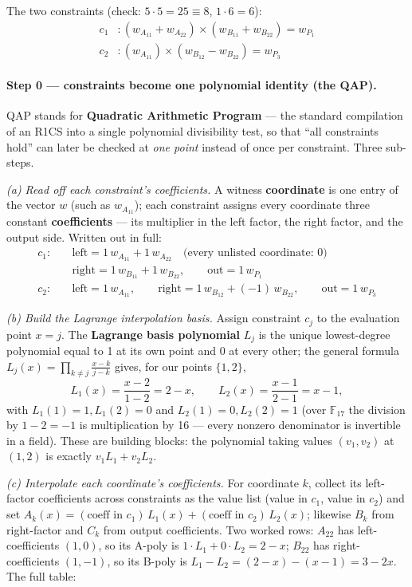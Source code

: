 \documentclass[10pt]{article}
\begin{document}
The two constraints (check: $5\cdot5 = 25 \equiv 8$,
$1\cdot6 = 6$):
\begin{align*}
c_1&: (w_{A_{11}} + w_{A_{22}}) \times (w_{B_{11}} + w_{B_{22}})
      = w_{P_1}\\
c_2&: (w_{A_{11}}) \times (w_{B_{12}} - w_{B_{22}}) = w_{P_3}
\end{align*}

\paragraph{Step 0 --- constraints become one polynomial identity
(the QAP).} QAP stands for \textbf{Quadratic Arithmetic Program}
\cite{ggpr} --- the standard compilation of an R1CS into a single
polynomial divisibility test, so that ``all constraints hold'' can
later be checked at \emph{one point} instead of once per
constraint. Three sub-steps.

\emph{(a) Read off each constraint's coefficients.} A witness
\textbf{coordinate} is one entry of the vector $w$ (such as
$w_{A_{11}}$); each constraint assigns every coordinate three
constant \textbf{coefficients} --- its multiplier in the left
factor, the right factor, and the output side. Written out in full:
\begin{align*}
c_1:\quad &\text{left} = 1\,w_{A_{11}} + 1\,w_{A_{22}}
  \quad\text{(every unlisted coordinate: 0)}\\
&\text{right} = 1\,w_{B_{11}} + 1\,w_{B_{22}}, \qquad
 \text{out} = 1\,w_{P_1}\\
c_2:\quad &\text{left} = 1\,w_{A_{11}}, \qquad
 \text{right} = 1\,w_{B_{12}} + (-1)\,w_{B_{22}}, \qquad
 \text{out} = 1\,w_{P_3}
\end{align*}

\emph{(b) Build the Lagrange interpolation basis.} Assign
constraint $c_j$ to the evaluation point $x = j$. The
\textbf{Lagrange basis polynomial} $L_j$ is the unique
lowest-degree polynomial equal to 1 at its own point and 0 at every
other; the general formula $L_j(x) = \prod_{k \ne j}
\frac{x-k}{j-k}$ gives, for our points $\{1, 2\}$,
\[
L_1(x) = \frac{x-2}{1-2} = 2 - x, \qquad
L_2(x) = \frac{x-1}{2-1} = x - 1,
\]
with $L_1(1)=1, L_1(2)=0$ and $L_2(1)=0, L_2(2)=1$ (over
$\mathbb{F}_{17}$ the division by $1-2 = -1$ is multiplication by
16 --- every nonzero denominator is invertible in a field). These
are building blocks: the polynomial taking values $(v_1, v_2)$ at
$(1, 2)$ is exactly $v_1 L_1 + v_2 L_2$.

\emph{(c) Interpolate each coordinate's coefficients.} For
coordinate $k$, collect its left-factor coefficients across
constraints as the value list (value in $c_1$, value in $c_2$) and
set $A_k(x) = (\text{coeff in } c_1)\,L_1(x) + (\text{coeff in }
c_2)\,L_2(x)$; likewise $B_k$ from right-factor and $C_k$ from
output coefficients. Two worked rows: $A_{22}$ has
left-coefficients $(1, 0)$, so its A-poly is $1\cdot L_1 + 0\cdot
L_2 = 2-x$; $B_{22}$ has right-coefficients $(1, -1)$, so its
B-poly is $L_1 - L_2 = (2-x)-(x-1) = 3-2x$. The full table:
\end{document}
